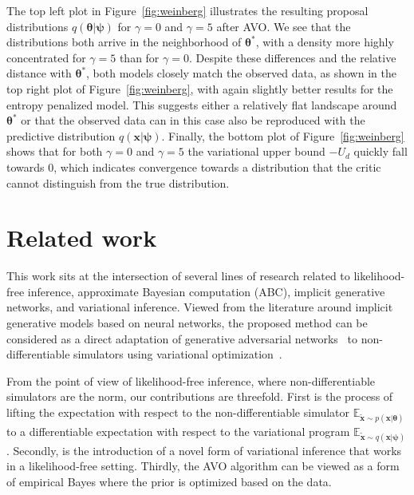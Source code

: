 \documentclass[twocolumn,superscriptaddress,aps]{revtex4-1}
\newcommand{\qxpsi}{q(\mathbf{x}|\bfpsi)}
\newcommand{\bftheta}{{\bm \theta}}
\newcommand{\bfpsi}{{\bm \psi}}
\newcommand{\bfx}{\mathbf{x}}
\newcommand{\bfz}{\mathbf{z}}
\theoremstyle{plain}
\begin{document}
The top left plot in Figure~\ref{fig:weinberg} illustrates the resulting
proposal distributions $q(\bftheta|\bfpsi)$ for $\gamma=0$ and $\gamma=5$ after
AVO. We see that the distributions both arrive
in the neighborhood of $\bftheta^*$, with a density  more highly concentrated for
$\gamma=5$ than for $\gamma=0$.  Despite these differences and the relative
distance with $\bftheta^*$, both models closely match the observed data, as shown
in the top right plot of  Figure~\ref{fig:weinberg}, with again slightly better
results for the entropy penalized model. This suggests either a relatively flat
landscape around $\bftheta^*$ or that the observed data can in this case also be
reproduced with the  predictive distribution $\qxpsi$.
Finally, the bottom plot of Figure~\ref{fig:weinberg} shows that for both
$\gamma=0$ and $\gamma=5$ the variational upper bound $-U_d$ quickly fall
towards $0$, which indicates  convergence towards a distribution that the critic
cannot distinguish from the true distribution.



\section{Related work}

This work sits at the intersection of several lines of research related to
likelihood-free inference, approximate Bayesian computation (ABC),
implicit generative networks, and variational inference.
Viewed from the literature around implicit generative models based on neural networks,
the proposed method can be considered as a direct adaptation of
generative adversarial networks~\citep{goodfellow2014generative,2017arXiv170104862A, 2017arXiv170107875A} to
non-differentiable simulators using variational optimization~\cite{2012arXiv1212.4507S,staines2013optimization}.

From the point of view of likelihood-free inference, where  non-differentiable
simulators are the norm, our contributions are threefold. First is the process
of lifting the expectation with respect to the non-differentiable simulator
$\mathbb{E}_{\tilde{\bfx} \sim p(\bfx | \bftheta)}$ to a differentiable
expectation with respect to the variational program $\mathbb{E}_{\tilde{\bfx}
\sim q(\bfx | \bfpsi)}$. Secondly, is the introduction of a novel form of
variational inference that works in a likelihood-free setting. Thirdly, the
AVO algorithm can be viewed as a form of empirical Bayes where the prior is
optimized based on the data.
\end{document}
